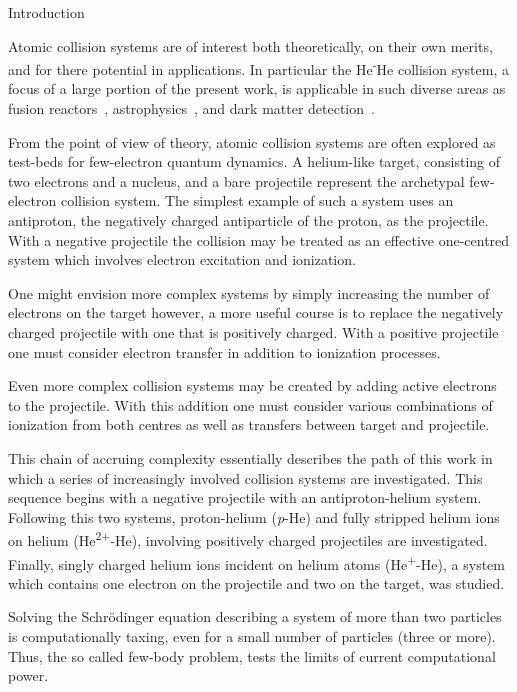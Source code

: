 \documentclass[letterpaper, 11 pt]{report}
\begin{document}
\begin{chapter}{Introduction \label{chap:intro}}

   Atomic collision systems are of interest both theoretically, on their own merits, and for there
   potential in applications. In particular the He\textsuperscript-He collision system, a focus of a
   large portion of the present work, is applicable in such diverse areas as fusion
   reactors~\cite{fusion1, fusion2}, astrophysics~\cite{astro1, astro2}, and dark matter
   detection~\cite{dmdet}.

   From the point of view of theory, atomic collision systems are often explored as test-beds for
   few-electron quantum dynamics. A helium-like target, consisting of two electrons and a nucleus, and a
   bare projectile represent the archetypal few-electron collision system. The simplest example of such
   a system uses an antiproton, the negatively charged antiparticle of the proton, as the projectile.
   With a negative projectile the collision may be treated as an effective one-centred system which
   involves electron excitation and ionization.

   One might envision more complex systems by simply increasing the number of electrons on the target
   however, a more useful course is to replace the negatively charged projectile with one that is
   positively charged. With a positive projectile one must consider electron transfer in addition to
   ionization processes.

   Even more complex collision systems may be created by adding active electrons to the projectile. With
   this addition one must consider various combinations of ionization from both centres as well as
   transfers between target and projectile.

   This chain of accruing complexity essentially describes the path of this work in which a series of
   increasingly involved collision systems are investigated. This sequence begins with a negative
   projectile with an antiproton-helium system. Following this two systems, proton-helium
   (\textit{p}-He) and fully stripped helium ions on helium (He\textsuperscript{2+}-He), involving
   positively charged projectiles are investigated. Finally, singly charged helium ions incident on
   helium atoms (He\textsuperscript{+}-He), a system which contains one electron on the projectile and
   two on the target, was studied.

   Solving the Schr\"{o}dinger equation describing a system of more than two particles is
   computationally taxing, even for a small number of particles (three or more). Thus, the so called
   few-body problem, tests the limits of current computational power.


\end{chapter}
\end{document}
